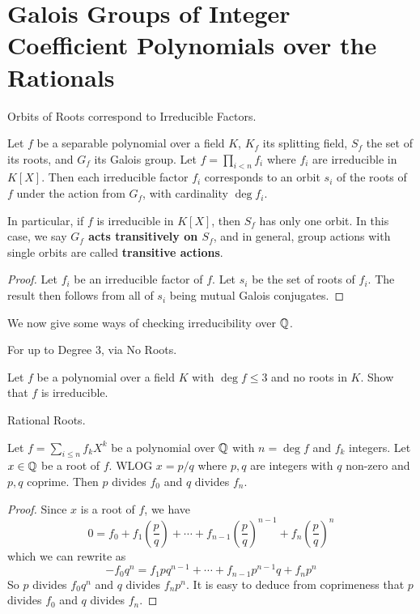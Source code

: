 \documentclass[../book.tex]{subfiles}
\begin{document}
\section{Galois Groups of Integer Coefficient Polynomials over the Rationals}

\begin{thm} Orbits of Roots correspond to Irreducible Factors.
    
    Let $f$ be a separable polynomial over a field $K$,
    $K_f$ its splitting field, $S_f$ the set of its roots, and $G_f$ its Galois group.
    Let $f = \prod_{i<n} f_i$ where $f_i$ are irreducible in $K[X]$.
    Then each irreducible factor $f_i$ corresponds 
    to an orbit $s_i$ of the roots of $f$ under the action from $G_f$,
    with cardinality $\deg f_i$. 
    
    In particular, if $f$ is irreducible in $K[X]$, 
    then $S_f$ has only one orbit. 
    In this case, we say \textbf{$G_f$ acts transitively on $S_f$},
    and in general, group actions with single orbits are called 
    \textbf{transitive actions}. 
    
\end{thm}
\begin{proof}
    
    Let $f_i$ be an irreducible factor of $f$. 
    Let $s_i$ be the set of roots of $f_i$.
    The result then follows from all of $s_i$ being mutual Galois conjugates. 
\end{proof}

We now give some ways of checking irreducibility over $\mathbb{Q}$.

\begin{ex} For up to Degree 3, via No Roots.
    
    Let $f$ be a polynomial over a field $K$
    with $\deg f \leq 3$ and no roots in $K$. 
    Show that $f$ is irreducible.
    
\end{ex}
\begin{thm} Rational Roots.
    
    Let $f = \sum_{i \leq n} f_k X^k$ be a polynomial over $\mathbb{Q}$ 
    with $n = \deg f$ and $f_k$ integers. 
    Let $x \in \mathbb{Q}$ be a root of $f$. 
    WLOG $x = p/q$ where $p, q$ are integers with $q$ non-zero and $p, q$ coprime. 
    Then $p$ divides $f_0$ and $q$ divides $f_{n}$. 
    
\end{thm}
\begin{proof}
    
    Since $x$ is a root of $f$, we have \[
        0 = f_0 + f_1 \left( \frac{p}{q} \right) + \cdots 
        + f_{n-1} \left( \frac{p}{q} \right)^{n-1}
        + f_n \left( \frac{p}{q} \right)^n
    \]
    which we can rewrite as    
    \[
        - f_0 q^{n} = f_1 p q^{n - 1} + \cdots 
        + f_{n - 1} p^{n - 1} q + f_{n} p^{n}
    \]
    So $p$ divides $f_0 q^n$ and $q$ divides $f_n p^n$. 
    It is easy to deduce from coprimeness that 
    $p$ divides $f_0$ and $q$ divides $f_n$.
    
\end{proof}
\end{document}
